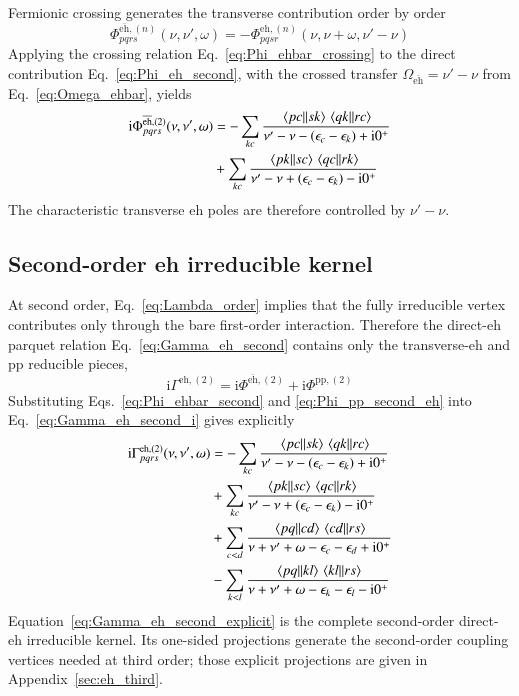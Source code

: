 \documentclass[aip,jcp,reprint,noshowkeys,superscriptaddress]{revtex4-1}
\newcommand{\eps}{\epsilon}
\newcommand{\ii}{\mathrm{i}}
\newcommand{\eh}{\text{eh}}
\newcommand{\teh}{\overline{\text{eh}}}
\newcommand{\pp}{\text{pp}}
\begin{document}
Fermionic crossing generates the transverse contribution order by order
\begin{equation}
	\Phi^{\teh,(n)}_{pqrs}(\nu,\nu',\omega)
	=
	-
	\Phi^{\eh,(n)}_{pqsr}
	\left(
	\nu,
	\nu+\omega,
	\nu'-\nu
	\right)
	\label{eq:Phi_ehbar_crossing}
\end{equation}
Applying the crossing relation
Eq.~\eqref{eq:Phi_ehbar_crossing} to the direct contribution
Eq.~\eqref{eq:Phi_eh_second}, with the crossed transfer
$\Omega_{\teh}=\nu'-\nu$ from Eq.~\eqref{eq:Omega_ehbar}, yields
\begin{equation}
	\begin{split}
	\ii\Phi^{\teh,(2)}_{pqrs}(\nu,\nu',\omega)
	&=
	-
	\sum_{kc}
	\frac{
	\mel{pc}{}{sk}
	\mel{qk}{}{rc}
	}
	{\nu'-\nu-(\eps_c-\eps_k)+\ii0^+}
	\\
	&+
	\sum_{kc}
	\frac{
	\mel{pk}{}{sc}
	\mel{qc}{}{rk}
	}
	{\nu'-\nu+(\eps_c-\eps_k)-\ii0^+}
	\end{split}
	\label{eq:Phi_ehbar_second}
\end{equation}
The characteristic transverse $\eh$ poles are therefore controlled
by $\nu'-\nu$.

\subsection{Second-order eh irreducible kernel}

At second order, Eq.~\eqref{eq:Lambda_order} implies that the fully
irreducible vertex contributes only through the bare first-order
interaction.
Therefore the direct-$\eh$ parquet relation
Eq.~\eqref{eq:Gamma_eh_second} contains only the transverse-$\eh$ and
$\pp$ reducible pieces,
\begin{equation}
	\ii\Gamma^{\eh,(2)}
	=
	\ii\Phi^{\teh,(2)}
	+
	\ii\Phi^{\pp,(2)}
	\label{eq:Gamma_eh_second_i}
\end{equation}
Substituting Eqs.~\eqref{eq:Phi_ehbar_second} and
\eqref{eq:Phi_pp_second_eh} into Eq.~\eqref{eq:Gamma_eh_second_i} gives
explicitly
\begin{equation}
	\begin{split}
	\ii\Gamma^{\eh,(2)}_{pqrs}(\nu,\nu',\omega)
	&=
	-
	\sum_{kc}
	\frac{
	\mel{pc}{}{sk}
	\mel{qk}{}{rc}
	}
	{\nu'-\nu-(\eps_c-\eps_k)+\ii0^+}
	\\
	&+
	\sum_{kc}
	\frac{
	\mel{pk}{}{sc}
	\mel{qc}{}{rk}
	}
	{\nu'-\nu+(\eps_c-\eps_k)-\ii0^+}
	\\
	&+
	\sum_{c<d}
	\frac{
	\mel{pq}{}{cd}
	\mel{cd}{}{rs}
	}
	{\nu+\nu'+\omega-\eps_c-\eps_d+\ii0^+}
	\\
	&-
	\sum_{k<l}
	\frac{
	\mel{pq}{}{kl}
	\mel{kl}{}{rs}
	}
	{\nu+\nu'+\omega-\eps_k-\eps_l-\ii0^+}
	\end{split}
	\label{eq:Gamma_eh_second_explicit}
\end{equation}
Equation~\eqref{eq:Gamma_eh_second_explicit} is the complete
second-order direct-$\eh$ irreducible kernel.
Its one-sided projections generate the second-order coupling vertices needed
at third order; those explicit projections are given in Appendix~\ref{sec:eh_third}.
\end{document}
